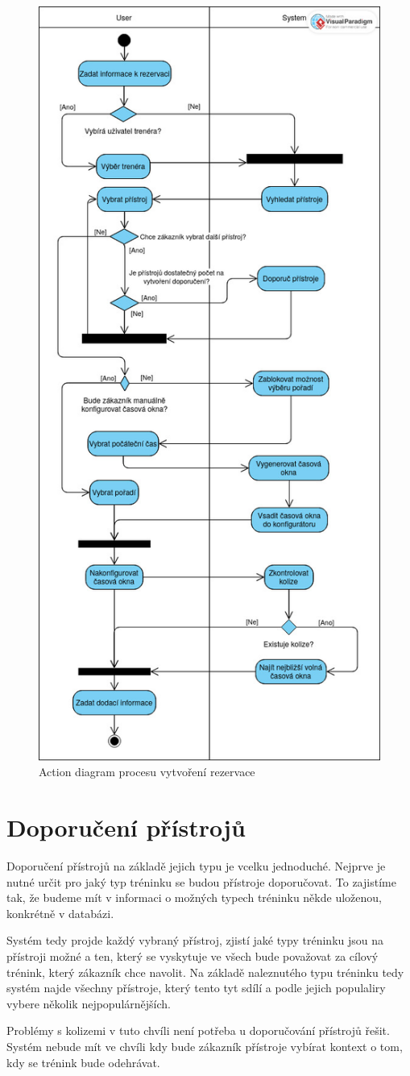 \begin{figure}
    \centering
    \includegraphics[width=.5\textwidth]{Figures/Bakalarka, rezervace.jpg}
    \caption{Action diagram procesu vytvoření rezervace}
    \label{fig:ReservationActionDiagram}
\end{figure}

\section{Doporučení přístrojů}
Doporučení přístrojů na základě jejich typu je vcelku jednoduché. Nejprve je nutné určit pro jaký typ tréninku se budou přístroje doporučovat. To zajistíme tak, že budeme mít v informaci o možných typech tréninku někde uloženou, konkrétně v databázi. 

Systém tedy projde každý vybraný přístroj, zjistí jaké typy tréninku jsou na přístroji možné a ten, který se vyskytuje ve všech bude považovat za cílový trénink, který zákazník chce navolit. Na základě naleznutého typu tréninku tedy systém najde všechny přístroje, který tento tyt sdílí a podle jejich populaliry vybere několik nejpopulárnějších. 

Problémy s kolizemi v tuto chvíli není potřeba u doporučování přístrojů řešit. Systém nebude mít ve chvíli kdy bude zákazník přístroje vybírat kontext o tom, kdy se trénink bude odehrávat.

